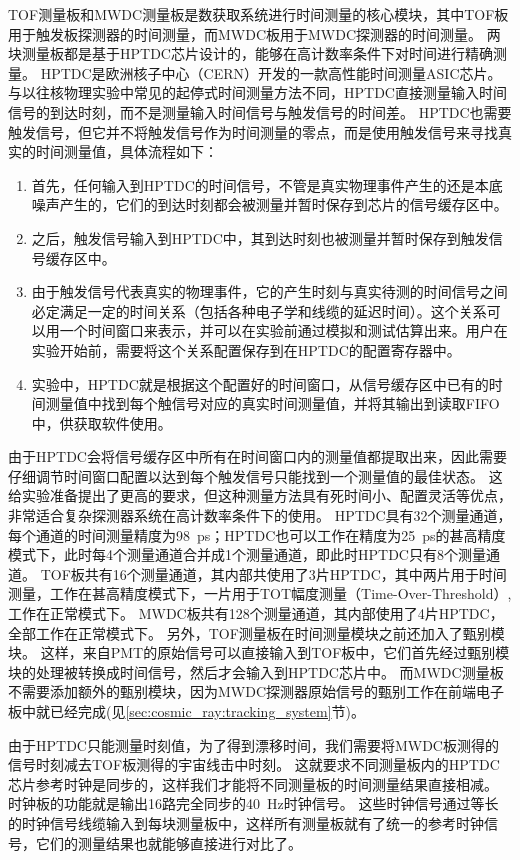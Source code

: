 TOF测量板和MWDC测量板是数获取系统进行时间测量的核心模块，其中TOF板用于触发板探测器的时间测量，而MWDC板用于MWDC探测器的时间测量。
两块测量板都是基于HPTDC芯片设计的，能够在高计数率条件下对时间进行精确测量。
HPTDC是欧洲核子中心（CERN）开发的一款高性能时间测量ASIC芯片\cite{TODO}。
与以往核物理实验中常见的起停式时间测量方法不同，HPTDC直接测量输入时间信号的到达时刻，而不是测量输入时间信号与触发信号的时间差。
HPTDC也需要触发信号，但它并不将触发信号作为时间测量的零点，而是使用触发信号来寻找真实的时间测量值，具体流程如下：
\begin{enumerate}
	\item 首先，任何输入到HPTDC的时间信号，不管是真实物理事件产生的还是本底噪声产生的，它们的到达时刻都会被测量并暂时保存到芯片的信号缓存区中。
	\item 之后，触发信号输入到HPTDC中，其到达时刻也被测量并暂时保存到触发信号缓存区中。
	\item 由于触发信号代表真实的物理事件，它的产生时刻与真实待测的时间信号之间必定满足一定的时间关系（包括各种电子学和线缆的延迟时间）。这个关系可以用一个时间窗口来表示，并可以在实验前通过模拟和测试估算出来。用户在实验开始前，需要将这个关系配置保存到在HPTDC的配置寄存器中。
	\item 实验中，HPTDC就是根据这个配置好的时间窗口，从信号缓存区中已有的时间测量值中找到每个触信号对应的真实时间测量值，并将其输出到读取FIFO中，供获取软件使用。
\end{enumerate}
由于HPTDC会将信号缓存区中所有在时间窗口内的测量值都提取出来，因此需要仔细调节时间窗口配置以达到每个触发信号只能找到一个测量值的最佳状态。
这给实验准备提出了更高的要求，但这种测量方法具有死时间小、配置灵活等优点，非常适合复杂探测器系统在高计数率条件下的使用。
HPTDC具有32个测量通道，每个通道的时间测量精度为\SI{98}{\pico\second}；HPTDC也可以工作在精度为\SI{25}{\pico\second}的甚高精度模式下，此时每4个测量通道合并成1个测量通道，即此时HPTDC只有8个测量通道。
TOF板共有16个测量通道，其内部共使用了3片HPTDC，其中两片用于时间测量，工作在甚高精度模式下，一片用于TOT幅度测量（Time-Over-Threshold）,工作在正常模式下。
MWDC板共有128个测量通道，其内部使用了4片HPTDC，全部工作在正常模式下。
另外，TOF测量板在时间测量模块之前还加入了甄别模块。
这样，来自PMT的原始信号可以直接输入到TOF板中，它们首先经过甄别模块的处理被转换成时间信号，然后才会输入到HPTDC芯片中。
而MWDC测量板不需要添加额外的甄别模块，因为MWDC探测器原始信号的甄别工作在前端电子板中就已经完成(见\ref{sec:cosmic_ray:tracking_system}节)。

由于HPTDC只能测量时刻值，为了得到漂移时间，我们需要将MWDC板测得的信号时刻减去TOF板测得的宇宙线击中时刻。
这就要求不同测量板内的HPTDC芯片参考时钟是同步的，这样我们才能将不同测量板的时间测量结果直接相减。
时钟板的功能就是输出16路完全同步的\SI{40}{Hz}时钟信号。
这些时钟信号通过等长的时钟信号线缆输入到每块测量板中，这样所有测量板就有了统一的参考时钟信号，它们的测量结果也就能够直接进行对比了。

